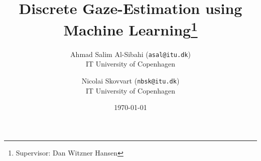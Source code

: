 \documentclass[a4paper]{article}%
\begin{document}
\title{Discrete Gaze-Estimation using Machine Learning\thanks{Supervisor: Dan Witzner Hansen}}
\author{Ahmad Salim Al-Sibahi (\texttt{asal@itu.dk})\\IT University of Copenhagen \and Nicolai Skovvart (\texttt{nbsk@itu.dk})\\IT University of Copenhagen}
\date{\today}


\maketitle



\tableofcontents













%





\appendix

%
\end{document}
